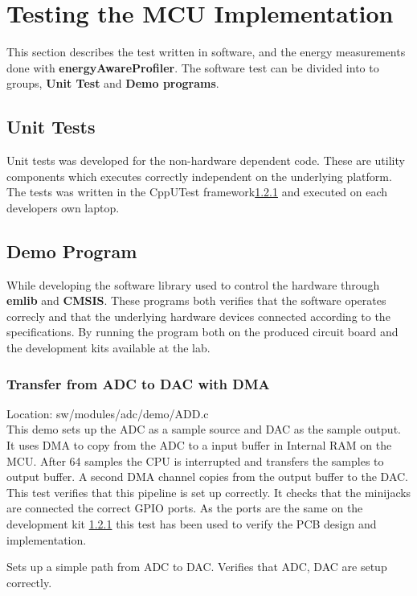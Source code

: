 \section{Testing the MCU Implementation}

This section describes the test written in software, and the energy measurements
done with {\bf energyAwareProfiler}. The software test can be divided into to
groups, {\bf Unit Test} and {\bf Demo programs}.

\subsection{Unit Tests}

Unit tests was developed for the non-hardware dependent code. These are utility components
which executes correctly independent on the underlying platform. The tests was written in
the CppUTest framework\ref{} and executed on each developers own laptop.

\subsection{Demo Program}

While developing the software library used to control the hardware through {\bf emlib} and
{\bf CMSIS}. These programs both verifies that the software operates correcly and that
the underlying hardware devices connected according to the specifications. By running the
program both on the produced circuit board and the development kits available at the lab.

\subsubsection{Transfer from ADC to DAC with DMA}
Location: sw/modules/adc/demo/ADD.c \\
This demo sets up the ADC as a sample source and DAC as the sample output. It uses DMA
to copy from the ADC to a input buffer in Internal RAM on the MCU. After 64 samples
the CPU is interrupted and transfers the samples to output buffer. A second DMA channel
copies from the output buffer to the DAC. This test verifies that this pipeline is set
up correctly. It checks that the minijacks are connected the correct GPIO ports. As
the ports are the same on the development kit \ref{} this test has been used to verify
the PCB design and implementation.

Sets up a simple path from ADC to DAC.
Verifies that ADC, DAC are setup correctly.

